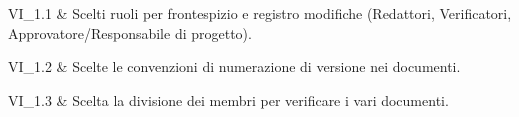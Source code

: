 VI\_1.1 & Scelti ruoli per frontespizio e registro modifiche (Redattori, Verificatori, Approvatore/Responsabile di progetto).

\tabularnewline 
VI\_1.2 & Scelte le convenzioni di numerazione di versione nei documenti.

\tabularnewline 
VI\_1.3 & Scelta la divisione dei membri per verificare i vari documenti.

	
	
